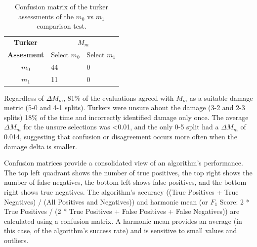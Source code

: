 
\begin{table}
\centering\begin{tabular}{cll}
\textbf{Turker} & \multicolumn{2}{c}{ \textbf{ $M_{m}$}}                           \\
\textbf{Assesment}                  &          Select $m_{0}$             &           Select $m_{1}$             \\ \cline{2-3} 
       $m_{0}$           & \multicolumn{1}{|l}{44} & \multicolumn{1}{|l|}{0} \\ \cline{2-3} 
       $m_{1}$           & \multicolumn{1}{|l}{11} & \multicolumn{1}{|l|}{0} \\ \cline{2-3} 
\end{tabular}
 \caption{Confusion matrix of the turker assessments of the $m_0$ vs $m_1$ comparison test.}
  \label{m0cm}
\end{table}


Regardless of {$\Delta M_m$}, 81\% of the evaluations agreed with $M_m$ as a suitable damage metric (5-0 and 4-1 splits). Turkers were unsure about the damage (3-2 and 2-3 splits) 18\% of the time and incorrectly identified damage only once. The average {$\Delta M_m$} for the unsure selections was <0.01, and the only 0-5 split had a {$\Delta M_m$} of 0.014, suggesting that confusion or disagreement occurs more often when the damage delta is smaller. 

Confusion matrices provide a consolidated view of an algorithm's performance. The top left quadrant shows the number of true positives, the top right shows the number of false negatives, the bottom left shows false positives, and the bottom right shows true negatives. The algorithm's accuracy ((True Positives + True Negatives) / (All Positives and Negatives)) and harmonic mean (or $F_1$ Score: 2 * True Positives / (2 * True Positives + False Positives + False Negatives)) are calculated using a confusion  matrix. A harmonic mean provides an average (in this case, of the algorithm's success rate) and is sensitive to small values and outliers.  

